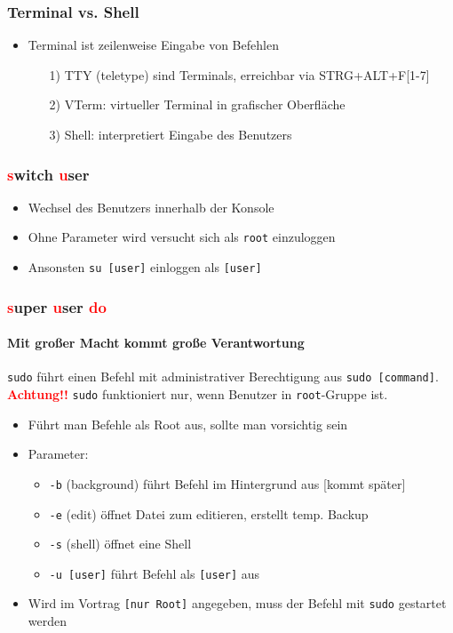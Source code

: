 \documentclass[12pt,utf8, handout]{beamer}
\begin{document}
\begin{frame}
\frametitle{Terminal vs. Shell}
\begin{itemize}
	\item Terminal ist zeilenweise Eingabe von Befehlen
	\begin{itemize}
		\item[1)] TTY (teletype) sind Terminals, erreichbar via STRG+ALT+F[1-7]
		\item[2)] VTerm: virtueller Terminal in grafischer Oberfläche
		\item[3)] Shell: interpretiert Eingabe des Benutzers
	\end{itemize}
\end{itemize}
\end{frame}

\begin{frame}
\frametitle{\textcolor{red}{s}witch \textcolor{red}{u}ser}
\begin{itemize}
	\item Wechsel des Benutzers innerhalb der Konsole
	\item Ohne Parameter wird versucht sich als \texttt{root} einzuloggen
	\item Ansonsten \texttt{su [user]} einloggen als \texttt{[user]}
\end{itemize}
\end{frame}

\begin{frame}
\frametitle{\textcolor{red}{s}uper \textcolor{red}{u}ser \textcolor{red}{do}}
\framesubtitle{\textcolor{ownDarkOr}{Mit großer Macht kommt große Verantwortung}}
\texttt{sudo} führt einen Befehl mit administrativer Berechtigung aus \texttt{sudo [command]}.
\textbf{\textcolor{red}{Achtung!!}} \texttt{sudo} funktioniert nur, wenn Benutzer in \texttt{root}-Gruppe ist.
\begin{itemize}[<+->]
	\item Führt man Befehle als Root aus, sollte man vorsichtig sein
	\item Parameter:
	\begin{itemize}[<+->]
		\item {\scriptsize \texttt{-b} (background) führt Befehl im Hintergrund aus [kommt später]}
		\item {\scriptsize \texttt{-e} (edit) öffnet Datei zum editieren, erstellt temp. Backup}
		\item {\scriptsize \texttt{-s} (shell) öffnet eine Shell}
		\item {\scriptsize \texttt{-u [user]} führt Befehl als \texttt{[user]} aus}
	\end{itemize}
	\item Wird im Vortrag \texttt{[nur Root]} angegeben, muss der Befehl mit \texttt{sudo} gestartet werden
\end{itemize}
\end{frame}
\end{document}
